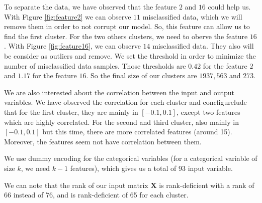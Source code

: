 \documentclass{article} %
\begin{document}
To separate the data, we have observed that the feature $2$ and $16$ could help us. With Figure \ref{fig:feature2} we can observe $11$ misclassified data, which we will remove them in order to not corrupt our model.  So, this feature can allow us to find the first cluster. For the two others clusters, we need to oberve the feature $16$. With Figure \ref{fig:feature16}, we can observe $14$ misclassified data. They also will be consider as outliers and remove. We set the threshold in order to minimize the number of misclassified data samples. Those thresholds are $0.42$ for the feature $2$ and $1.17$ for the feature $16$. So the final size of our clusters are $1937, 563$ and $273$.

We are also interested about the correlation between the input and output variables. We have observed the correlation for each cluster and concfigurelude that for the first cluster, they are mainly in $[-0.1,0.1]$, except two features which are highly correlated. For the second and third cluster, also mainly in $[-0.1,0.1]$ but this time, there are more correlated features (around 15). Moreover, the features seem not have correlation between them.

We use dummy encoding for the categorical variables (for a categorical variable of size $k$, we need $k-1$ features), which gives us a total of $93$ input variable.

We can note that the rank of our input matrix $\mathbf{X}$ is rank-deficient with a rank of 66 instead of 76, and is rank-deficient of 65 for each cluster.
\end{document}
